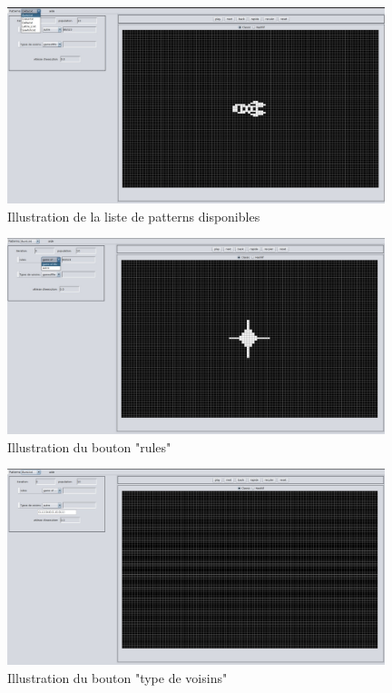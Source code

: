 \begin{figure}[h]
\centering
\includegraphics[width=11cm]{images/image4.jpeg}
\caption{Illustration de la liste de patterns disponibles}
\end{figure}
\newpage
\begin{figure}[h]
\centering
\includegraphics[width=11cm]{images/image3.jpeg}
\caption{Illustration du bouton "rules"}
\end{figure}
\begin{figure}[h]
\centering
\includegraphics[width=11cm]{images/image5.JPG}
\caption{Illustration du bouton "type de voisins"}
\end{figure}
